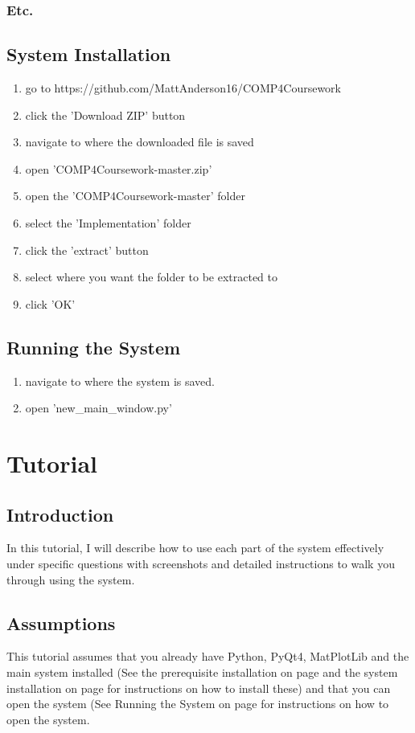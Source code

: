 \subsubsection{Etc.}

\subsection{System Installation}
\label{System_Installation}
\begin{enumerate}
	\item go to https://github.com/MattAnderson16/COMP4Coursework
	\item click the 'Download ZIP' button
	\item navigate to where the downloaded file is saved
	\item open 'COMP4Coursework-master.zip'
	\item open the 'COMP4Coursework-master' folder 
	\item select the 'Implementation' folder
	\item click the 'extract' button
	\item select where you want the folder to be extracted to
	\item click 'OK'
\end{enumerate}

\subsection{Running the System}
\label{Running_the_System}
\begin{enumerate}
	\item navigate to where the system is saved.
	\item open 'new\_main\_window.py'
\end{enumerate}

\section{Tutorial}
\subsection{Introduction}
In this tutorial, I will describe how to use each part of the system effectively under specific questions with screenshots and detailed instructions to walk you through using the system.

\subsection{Assumptions}
This tutorial assumes that you already have Python, PyQt4, MatPlotLib and the main system installed (See the prerequisite installation on page \pageref{Prerequisite_Installation} and the system installation on page \pageref{System_Installation} for instructions on how to install these) and that you can open the system (See Running the System on page \pageref{Running_the_System} for instructions on how to open the system.

